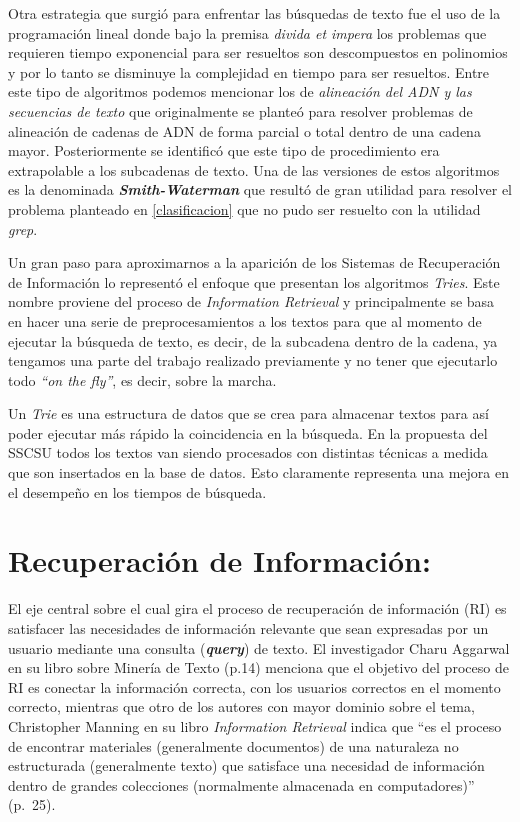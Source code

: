 \documentclass[
  10,
  openany]{book}
\begin{document}
Otra estrategia que surgió para enfrentar las búsquedas de texto fue el uso de la programación lineal donde bajo la premisa \emph{divida et impera} los problemas que requieren tiempo exponencial para ser resueltos son descompuestos en polinomios y por lo tanto se disminuye la complejidad en tiempo para ser resueltos. Entre este tipo de algoritmos podemos mencionar los de \emph{alineación del ADN y las secuencias de texto} que originalmente se planteó para resolver problemas de alineación de cadenas de ADN de forma parcial o total dentro de una cadena mayor. Posteriormente se identificó que este tipo de procedimiento era extrapolable a los subcadenas de texto. Una de las versiones de estos algoritmos es la denominada \textbf{\emph{Smith-Waterman}} que resultó de gran utilidad para resolver el problema planteado en \ref{clasificacion} que no pudo ser resuelto con la utilidad \emph{grep}.

Un gran paso para aproximarnos a la aparición de los Sistemas de Recuperación de Información lo representó el enfoque que presentan los algoritmos \emph{Tries}. Este nombre proviene del proceso de \emph{Information Retrieval} y principalmente se basa en hacer una serie de preprocesamientos a los textos para que al momento de ejecutar la búsqueda de texto, es decir, de la subcadena dentro de la cadena, ya tengamos una parte del trabajo realizado previamente y no tener que ejecutarlo todo \emph{``on the fly''}, es decir, sobre la marcha.

Un \emph{Trie} \citep{fredkin1960} es una estructura de datos que se crea para almacenar textos para así poder ejecutar más rápido la coincidencia en la búsqueda. En la propuesta del SSCSU todos los textos van siendo procesados con distintas técnicas a medida que son insertados en la base de datos. Esto claramente representa una mejora en el desempeño en los tiempos de búsqueda.

\hypertarget{recuperaciuxf3n-de-informaciuxf3n}{%
\section{Recuperación de Información:}\label{recuperaciuxf3n-de-informaciuxf3n}}

El eje central sobre el cual gira el proceso de recuperación de información (RI) es satisfacer las necesidades de información relevante que sean expresadas por un usuario mediante una consulta (\textbf{\emph{query}}) de texto. El investigador Charu Aggarwal en su libro sobre Minería de Texto \citep{miningt2012} (p.14) menciona que el objetivo del proceso de RI es conectar la información correcta, con los usuarios correctos en el momento correcto, mientras que otro de los autores con mayor dominio sobre el tema, Christopher Manning en su libro \emph{Information Retrieval} indica que ``es el proceso de encontrar materiales (generalmente documentos) de una naturaleza no estructurada (generalmente texto) que satisface una necesidad de información dentro de grandes colecciones (normalmente almacenada en computadores)'' \citep{manning2008} (p.~25).
\end{document}
